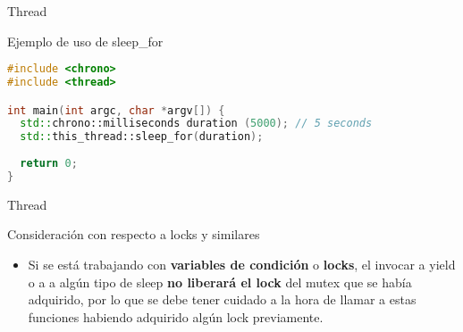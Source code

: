 \begin{frame}[fragile]{Thread}
\begin{block}{Ejemplo de uso de sleep\_for}
\begin{lstlisting}[language=C++, basicstyle=\small]
#include <chrono>
#include <thread>

int main(int argc, char *argv[]) {
  std::chrono::milliseconds duration (5000); // 5 seconds
  std::this_thread::sleep_for(duration);
  
  return 0;
}
\end{lstlisting}
\end{block}
\end{frame}

\begin{frame}{Thread}
\begin{block}{Consideración con respecto a locks y similares}
\begin{itemize}
  \item Si se está trabajando con \textbf{variables de condición} o \textbf{locks}, el invocar a yield o a a algún tipo de sleep \textbf{no liberará el lock} del mutex que se había adquirido, por lo que se debe tener cuidado a la hora de llamar a estas funciones habiendo adquirido algún lock previamente.
\end{itemize}
\end{block}
\end{frame}